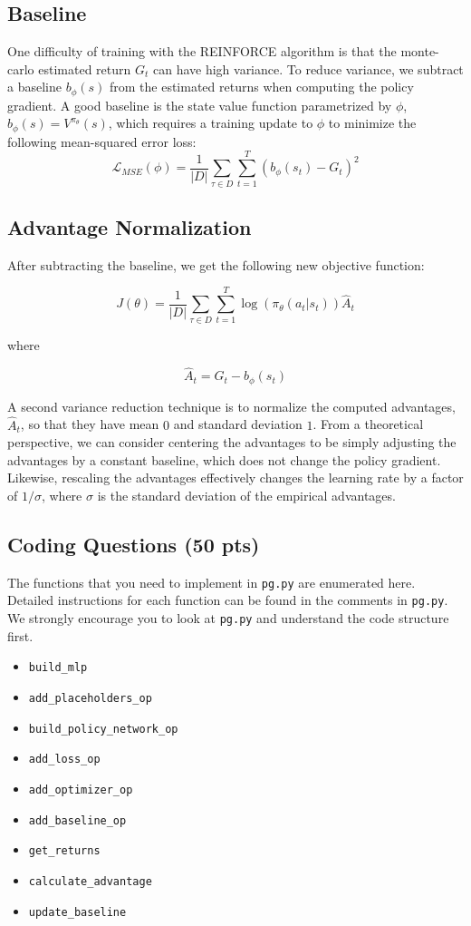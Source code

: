 \documentclass{article}
\begin{document}
\subsection*{Baseline}
One difficulty of training with the REINFORCE algorithm is that the monte-carlo estimated return $G_t$ can have high variance. To reduce variance, we subtract a baseline $b_{\phi}(s)$ from the estimated returns when computing the policy gradient. A good baseline is the state value function parametrized by $\phi$, $b_{\phi}(s) = V^{\pi_\theta}(s)$, which requires a training update to $\phi$ to minimize the following mean-squared error loss:
\[ \mathcal{L}_{MSE}(\phi) = \frac{1}{|D|} \sum_{\tau \in D} \sum_{t=1}^T (b_{\phi}(s_t) - G_t)^2\]
\subsection*{Advantage Normalization}

After subtracting the baseline, we get the following new objective function:

\[ J(\theta) = \frac{1}{|D|} \sum_{\tau \in D} \sum_{t=1}^T \log(\pi_\theta(a_t|s_t)) \hat{A}_t \]

where

\[\hat{A}_t=G_t - b_{\phi}(s_t)\]

A second variance reduction technique is to normalize the computed advantages, $\hat{A}_t$, so that they have mean $0$ and standard deviation $1$. From a theoretical perspective, we can consider centering the advantages to be simply adjusting the advantages by a constant baseline, which does not change the policy gradient. Likewise, rescaling the advantages effectively changes the learning rate by a factor of $1/\sigma$, where $\sigma$ is the standard deviation of the empirical advantages.

\subsection{Coding Questions (50 pts)}
The functions that you need to implement in \texttt{pg.py} are enumerated here. Detailed instructions for each function can be found in the comments in \texttt{pg.py}. We strongly encourage you to look at \texttt{pg.py} and understand the code structure first.
\begin{itemize}
\item\texttt{build\_mlp}
\item\texttt{add\_placeholders\_op}
\item\texttt{build\_policy\_network\_op}
\item\texttt{add\_loss\_op}
\item\texttt{add\_optimizer\_op}
\item\texttt{add\_baseline\_op}
\item\texttt{get\_returns}
\item\texttt{calculate\_advantage}
\item\texttt{update\_baseline}
\end{itemize} 
\end{document}
